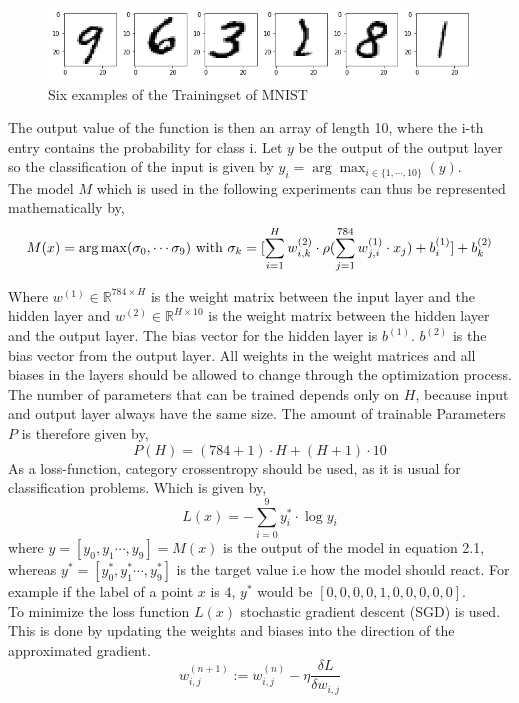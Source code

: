 \begin{figure}
\centering
\includegraphics[width= 1\linewidth]{Abschlussarbeit_2021/LaTeX/images/MNIST.png}
\caption{ Six examples of the Trainingset of MNIST}
\end{figure}

The output value of the function is then an array of length 10, where the i-th entry contains the probability for class i. Let $y$ be the output of the output layer so the classification of the input is given by $y_i = \arg\max_{i \in \{1, \cdots,10\}}(y)$. \\
The model $M$ which is used in the following experiments can thus be represented mathematically by,
\begin{equation}
    M(x) = \arg\max(\sigma_0, \cdots \sigma_9) \\
    \text{ with } \sigma_k = [\sum_{i = 1}^H w^{(2)}_{i,k} \cdot \rho(\sum_{j=1}^{784}w^{(1)}_{j,i}\cdot x_j) + b^{(1)}_i] + b^{(2)}_k
    \label{model equation}
\end{equation}

Where $w^{(1)} \in \mathbb{R}^{784 \times H}$ is the weight matrix between the input layer and the hidden layer and $w^{(2)} \in \mathbb{R}^{H \times 10}$ is the weight matrix between the hidden layer and the output layer. The bias vector for the hidden layer is $b^{(1)}$. $b^{(2)}$ is the bias vector from the output layer. All weights in the weight matrices and all biases in the layers should be allowed to change through the optimization process. The number of parameters that can be trained depends only on $H$, because input and output layer always have the same size. The amount of trainable Parameters $P$ is therefore given by,
$$
P(H) = (784+1)\cdot H + (H+1) \cdot 10
$$
As a loss-function, category crossentropy should be used, as it is usual for classification problems. Which is given by,
\begin{equation}
    L(x) =  - \sum_{i = 0}^{9} y_i^* \cdot \log y_i
    \label{scc_eq}
\end{equation}
where $y = [y_0,y_1 \cdots, y_9] = M(x)$ is the output of the model in equation 2.1, whereas $y^* =[y^*_0,y^*_1 \cdots, y^*_9]$ is the target value i.e how the model should react. For example if the label of a point $x$ is $4$, $y^*$ would be $[0,0,0,0,1,0,0,0,0,0]$. \\
To minimize the loss function $L(x)$ stochastic gradient descent (SGD) is used. This is done by updating the weights and biases into the direction of the approximated gradient.
$$
w_{i,j}^{(n+1)} := w_{i,j}^{(n)}  - \eta \frac{\delta L}{\delta w_{i,j}}
$$


